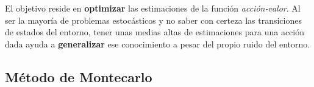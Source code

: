 \documentclass[11pt,fleqn]{book} %
\begin{document}
%
%	
%	

El objetivo reside en \textbf{optimizar} las estimaciones de la función \textit{acción-valor}. Al ser la mayoría de problemas estocásticos y no saber con certeza las transiciones de estados del entorno, tener unas medias altas de estimaciones para una acción dada ayuda a \textbf{generalizar} ese conocimiento a pesar del propio ruido del entorno.

\subsection{Método de Montecarlo}
\end{document}
